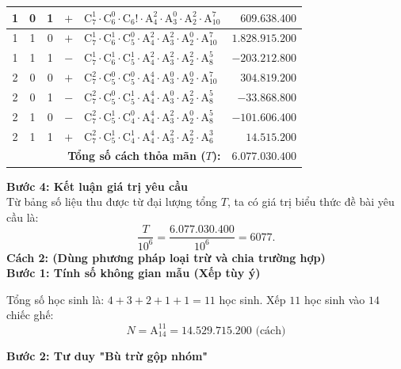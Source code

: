 \begin{ex}
{\begin{center}
\begin{tabular}{|c|c|c|c|l|r|}
				1 & 0 & 1 & $+$ & $\mathrm{C}_7^1 \cdot \mathrm{C}_6^0 \cdot \mathrm{C}_6! \cdot \mathrm{A}_4^2 \cdot \mathrm{A}_3^0 \cdot \mathrm{A}_2^2 \cdot \mathrm{A}_{10}^7$ & $609.638.400$ \\ \hline
				1 & 1 & 0 & $+$ & $\mathrm{C}_7^1 \cdot \mathrm{C}_6^1 \cdot \mathrm{C}_5^0 \cdot \mathrm{A}_4^2 \cdot \mathrm{A}_3^2 \cdot \mathrm{A}_2^0 \cdot \mathrm{A}_{10}^7$ & $1.828.915.200$ \\ \hline
				1 & 1 & 1 & $-$ & $\mathrm{C}_7^1 \cdot \mathrm{C}_6^1 \cdot \mathrm{C}_5^1 \cdot \mathrm{A}_4^2 \cdot \mathrm{A}_3^2 \cdot \mathrm{A}_2^2 \cdot \mathrm{A}_8^5$ & $-203.212.800$ \\ \hline
				2 & 0 & 0 & $+$ & $\mathrm{C}_7^2 \cdot \mathrm{C}_5^0 \cdot \mathrm{C}_5^0 \cdot \mathrm{A}_4^4 \cdot \mathrm{A}_3^0 \cdot \mathrm{A}_2^0 \cdot \mathrm{A}_{10}^7$ & $304.819.200$ \\ \hline
				2 & 0 & 1 & $-$ & $\mathrm{C}_7^2 \cdot \mathrm{C}_5^0 \cdot \mathrm{C}_5^1 \cdot \mathrm{A}_4^4 \cdot \mathrm{A}_3^0 \cdot \mathrm{A}_2^2 \cdot \mathrm{A}_8^5$ & $-33.868.800$ \\ \hline
				2 & 1 & 0 & $-$ & $\mathrm{C}_7^2 \cdot \mathrm{C}_5^1 \cdot \mathrm{C}_4^0 \cdot \mathrm{A}_4^4 \cdot \mathrm{A}_3^2 \cdot \mathrm{A}_2^0 \cdot \mathrm{A}_8^5$ & $-101.606.400$ \\ \hline
				2 & 1 & 1 & $+$ & $\mathrm{C}_7^2 \cdot \mathrm{C}_5^1 \cdot \mathrm{C}_4^1 \cdot \mathrm{A}_4^4 \cdot \mathrm{A}_3^2 \cdot \mathrm{A}_2^2 \cdot \mathrm{A}_6^3$ & $14.515.200$ \\ \hline
				\multicolumn{5}{|r|}{\textbf{Tổng số cách thỏa mãn ($T$):}} & $\mathbf{6.077.030.400}$ \\ \hline
			\end{tabular}
		\end{center}
		\textbf{Bước 4: Kết luận giá trị yêu cầu}\\
		Từ bảng số liệu thu được từ đại lượng tổng $T$, ta có giá trị biểu thức đề bài yêu cầu là:
		$$\dfrac{T}{10^6} = \dfrac{6.077.030.400}{10^6} = 6077.$$
		\textbf{Cách 2: (Dùng phương pháp loại trừ và chia trường hợp)}\\
		\textbf{Bước 1: Tính số không gian mẫu (Xếp tùy ý)}
		
		Tổng số học sinh là: $4 + 3 + 2 + 1 + 1 = 11$ học sinh. Xếp $11$ học sinh vào $14$ chiếc ghế:
		$$N = \mathrm{A}_{14}^{11} = 14.529.715.200 \text{ (cách)}$$
		
		\textbf{Bước 2: Tư duy "Bù trừ gộp nhóm"}
		
}
\end{ex}

